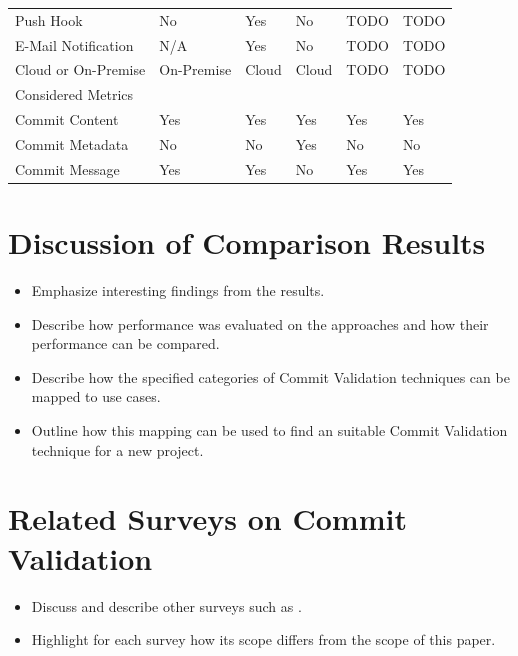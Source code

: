 \begin{table}[t]
\begin{tabular}{@{}llllll@{}}
		Push Hook                          & No         & Yes    & No      & TODO   & TODO  \\
		E-Mail Notification                & N/A        & Yes    & No      & TODO   & TODO  \\
		Cloud or On-Premise                & On-Premise & Cloud  & Cloud   & TODO   & TODO  \\ \midrule
		Considered Metrics                 &            &        &         &        &       \\ \midrule
		Commit Content                     & Yes        & Yes    & Yes     & Yes    & Yes   \\
		Commit Metadata                    & No         & No     & Yes     & No     & No    \\
		Commit Message                     & Yes        & Yes    & No      & Yes    & Yes  
	\end{tabular}
	\label{tab:classification}
\end{table}

\section{Discussion of Comparison Results}
\label{sec:discussion}
\begin{itemize}
	\item Emphasize interesting findings from the results.
	\item Describe how performance was evaluated on the approaches and how their performance can be compared.
	\item Describe how the specified categories of Commit Validation techniques can be mapped to use cases.
	\item Outline how this mapping can be used to find an suitable Commit Validation technique for a new project.
\end{itemize}


\section{Related Surveys on Commit Validation}
\label{sec:relatedsurveys}
\begin{itemize}
	\item Discuss and describe other surveys such as \cite{Kim2008,Catolino2019,Syed2019,Yang2016}.
	\item Highlight for each survey how its scope differs from the scope of this paper.
\end{itemize}


